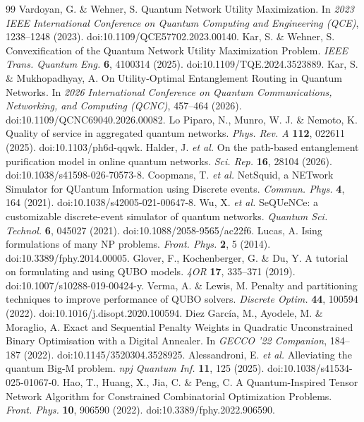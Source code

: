 \documentclass[pdflatex,sn-nature]{sn-jnl}
\theoremstyle{plain}
\theoremstyle{remark}
\begin{document}
\begin{thebibliography}{99}
 Vardoyan, G. \& Wehner, S. Quantum Network Utility Maximization. In \textit{2023 IEEE International Conference on Quantum Computing and Engineering (QCE)}, 1238--1248 (2023). doi:10.1109/QCE57702.2023.00140.
 Kar, S. \& Wehner, S. Convexification of the Quantum Network Utility Maximization Problem. \textit{IEEE Trans. Quantum Eng.} \textbf{6}, 4100314 (2025). doi:10.1109/TQE.2024.3523889.
 Kar, S. \& Mukhopadhyay, A. On Utility-Optimal Entanglement Routing in Quantum Networks. In \textit{2026 International Conference on Quantum Communications, Networking, and Computing (QCNC)}, 457--464 (2026). doi:10.1109/QCNC69040.2026.00082.
 Lo Piparo, N., Munro, W. J. \& Nemoto, K. Quality of service in aggregated quantum networks. \textit{Phys. Rev. A} \textbf{112}, 022611 (2025). doi:10.1103/ph6d-qqwk.
 Halder, J. \textit{et al.} On the path-based entanglement purification model in online quantum networks. \textit{Sci. Rep.} \textbf{16}, 28104 (2026). doi:10.1038/s41598-026-70573-8.
 Coopmans, T. \textit{et al.} NetSquid, a NETwork Simulator for QUantum Information using Discrete events. \textit{Commun. Phys.} \textbf{4}, 164 (2021). doi:10.1038/s42005-021-00647-8.
 Wu, X. \textit{et al.} SeQUeNCe: a customizable discrete-event simulator of quantum networks. \textit{Quantum Sci. Technol.} \textbf{6}, 045027 (2021). doi:10.1088/2058-9565/ac22f6.
 Lucas, A. Ising formulations of many NP problems. \textit{Front. Phys.} \textbf{2}, 5 (2014). doi:10.3389/fphy.2014.00005.
 Glover, F., Kochenberger, G. \& Du, Y. A tutorial on formulating and using QUBO models. \textit{4OR} \textbf{17}, 335--371 (2019). doi:10.1007/s10288-019-00424-y.
 Verma, A. \& Lewis, M. Penalty and partitioning techniques to improve performance of QUBO solvers. \textit{Discrete Optim.} \textbf{44}, 100594 (2022). doi:10.1016/j.disopt.2020.100594.
 Diez Garc{\'i}a, M., Ayodele, M. \& Moraglio, A. Exact and Sequential Penalty Weights in Quadratic Unconstrained Binary Optimisation with a Digital Annealer. In \textit{GECCO '22 Companion}, 184--187 (2022). doi:10.1145/3520304.3528925.
 Alessandroni, E. \textit{et al.} Alleviating the quantum Big-M problem. \textit{npj Quantum Inf.} \textbf{11}, 125 (2025). doi:10.1038/s41534-025-01067-0.
 Hao, T., Huang, X., Jia, C. \& Peng, C. A Quantum-Inspired Tensor Network Algorithm for Constrained Combinatorial Optimization Problems. \textit{Front. Phys.} \textbf{10}, 906590 (2022). doi:10.3389/fphy.2022.906590.

\end{thebibliography}
\end{document}
